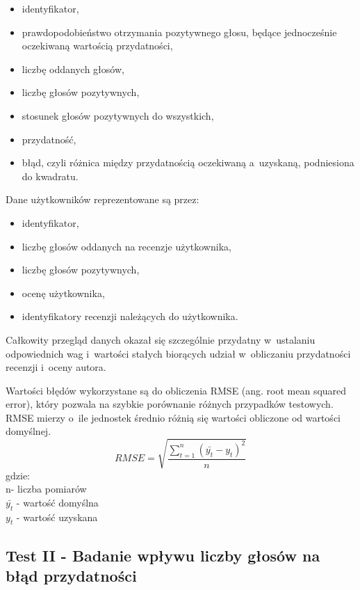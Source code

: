 \begin{itemize}
\item identyfikator,
\item prawdopodobieństwo otrzymania pozytywnego głosu, będące jednocześnie oczekiwaną wartością przydatności,
\item liczbę oddanych głosów,
\item liczbę głosów pozytywnych,
\item stosunek głosów pozytywnych do wszystkich,
\item przydatność,
\item błąd, czyli różnica między przydatnością oczekiwaną a~uzyskaną, podniesiona do kwadratu.
\end{itemize}

Dane użytkowników reprezentowane są przez:

\begin{itemize}
\item identyfikator,
\item liczbę głosów oddanych na recenzje użytkownika,
\item liczbę głosów pozytywnych,
\item ocenę użytkownika,
\item identyfikatory recenzji należących do użytkownika.
\end{itemize}

Całkowity przegląd danych okazał się szczególnie przydatny w~ustalaniu odpowiednich wag i~wartości stałych biorących udział w~obliczaniu przydatności recenzji i~oceny autora.

Wartości błędów wykorzystane są do obliczenia RMSE (ang. root mean squared error), który pozwala na szybkie porównanie różnych przypadków testowych. RMSE mierzy o~ile jednostek średnio różnią się wartości obliczone od wartości domyślnej.\cite{rmseWiki}\\
\begin{equation}
RMSE=\sqrt{\frac{\sum_{t=1}^n (\bar{y_{t}}-y_{t})^2}{n}}
\end{equation}
gdzie:\\
n- liczba pomiarów\\
$\bar{y_{t}}$ - wartość domyślna\\
$y_{t}$ - wartość uzyskana\\

\subsection{Test II - Badanie wpływu liczby głosów na błąd przydatności}

